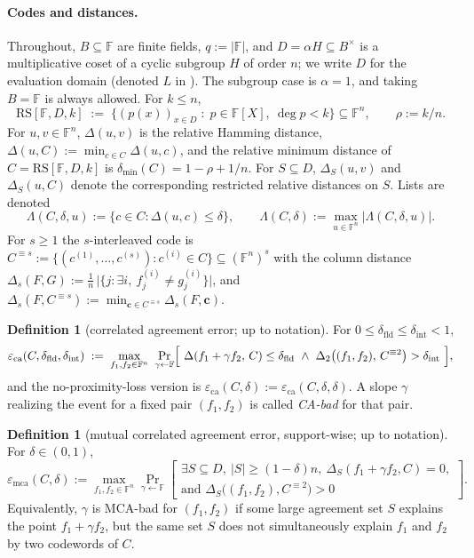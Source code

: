 \documentclass[11pt]{article}
\theoremstyle{definition}
\newtheorem{definition}[theorem]{Definition}
\theoremstyle{remark}
\newcommand{\F}{\mathbb{F}}
\newcommand{\B}{B}
\newcommand{\RS}{\mathrm{RS}}
\newcommand{\eca}{\varepsilon_{\mathrm{ca}}}
\newcommand{\emca}{\varepsilon_{\mathrm{mca}}}
\newcommand{\dmin}{\delta_{\min}}
\newcommand{\dist}{\Delta}
\newcommand{\distS}{\Delta_S}
\newcommand{\Lst}{\Lambda}
\begin{document}
\paragraph{Codes and distances.} Throughout, $\B\subseteq\F$ are finite fields, $q:=|\F|$, and $D=\alpha H\subseteq\B^\times$ is a multiplicative coset of a cyclic subgroup $H$ of order $n$; we write $D$ for the evaluation domain (denoted $L$ in \cite{ABF26}). The subgroup case is $\alpha=1$, and taking $\B=\F$ is always allowed. For $k\le n$,
\[
\RS[\F,D,k]\;:=\;\bigl\{(p(x))_{x\in D}\;:\;p\in\F[X],\ \deg p<k\bigr\}\subseteq\F^n,
\qquad \rho:=k/n .
\]
For $u,v\in\F^n$, $\dist(u,v)$ is the relative Hamming distance, $\dist(u,C):=\min_{c\in C}\dist(u,c)$, and the relative minimum distance of $C=\RS[\F,D,k]$ is $\dmin(C)=1-\rho+1/n$. For $S\subseteq D$, $\distS(u,v)$ and $\distS(u,C)$ denote the corresponding restricted relative distances on $S$. Lists are denoted
\[
\Lst(C,\delta,u):=\{c\in C:\dist(u,c)\le\delta\},\qquad \Lst(C,\delta):=\max_{u\in\F^n}|\Lst(C,\delta,u)| .
\]
For $s\ge1$ the $s$-interleaved code is $C^{\equiv s}:=\{(c^{(1)},\dots,c^{(s)}):c^{(i)}\in C\}\subseteq(\F^n)^s$ with the column distance $\dist_s(F,G):=\frac1n\,\bigl|\{j:\exists i,\ f^{(i)}_j\ne g^{(i)}_j\}\bigr|$, and $\dist_s(F,C^{\equiv s}):=\min_{\mathbf c\in C^{\equiv s}}\dist_s(F,\mathbf c)$.

\begin{definition}[correlated agreement error; {\cite[Def.~4.1]{ABF26}} up to notation]\label{def:ca}
For $0\le\delta_{\mathrm{fld}}\le\delta_{\mathrm{int}}<1$,
\[
\eca(C,\delta_{\mathrm{fld}},\delta_{\mathrm{int}})\;:=\;\max_{f_1,f_2\in\F^n}\ \Pr_{\gamma\leftarrow\F}\Bigl[\ \dist(f_1+\gamma f_2,\,C)\le\delta_{\mathrm{fld}}\ \wedge\ \dist_2\bigl((f_1,f_2),\,C^{\equiv2}\bigr)>\delta_{\mathrm{int}}\ \Bigr],
\]
and the no-proximity-loss version is $\eca(C,\delta):=\eca(C,\delta,\delta)$. A slope $\gamma$ realizing the event for a fixed pair $(f_1,f_2)$ is called \emph{CA-bad} for that pair.
\end{definition}

\begin{definition}[mutual correlated agreement error, support-wise; {\cite[Def.~4.3]{ABF26}} up to notation]\label{def:mca}
For $\delta\in(0,1)$,
\[
\emca(C,\delta):=\max_{f_1,f_2\in\F^n}\Pr_{\gamma\leftarrow\F}\left[
\begin{array}{l}
\exists S\subseteq D,\ |S|\ge(1-\delta)n,\ \distS(f_1+\gamma f_2,C)=0,\\[2pt]
\text{and }\distS\bigl((f_1,f_2),C^{\equiv2}\bigr)>0
\end{array}
\right].
\]
Equivalently, $\gamma$ is MCA-bad for $(f_1,f_2)$ if some large agreement set $S$ explains the point $f_1+\gamma f_2$, but the same set $S$ does not simultaneously explain $f_1$ and $f_2$ by two codewords of $C$.
\end{definition}
\end{document}
